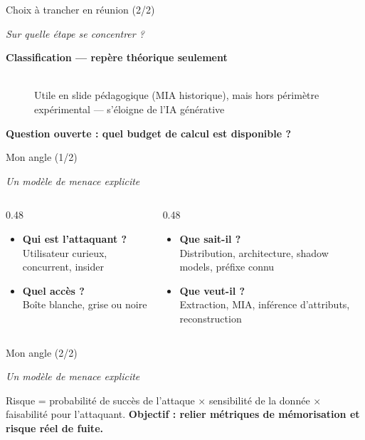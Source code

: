 \documentclass[aspectratio=169, 10pt, table]{beamer}
\newcommand{\subtitleline}[1]{{\small\itshape\color{TSPcyan}#1\par}\vspace{0.2cm}}
\begin{document}
\begin{frame}{Choix à trancher en réunion (2/2)}
    \subtitleline{Sur quelle étape se concentrer ?}
    
    \begin{description}
        \item[\textbf{Classification — repère théorique seulement}] \hfill \\
        Utile en slide pédagogique (MIA historique), mais hors périmètre expérimental — s'éloigne de l'IA générative
    \end{description}
    \vspace{0.4cm}
    \textbf{Question ouverte : quel budget de calcul est disponible ?}
\end{frame}

\begin{frame}{Mon angle (1/2)}
    \subtitleline{Un modèle de menace explicite}
    
    \begin{columns}[T]
        \begin{column}{0.48\textwidth}
            \begin{itemize}
                \item \textbf{Qui est l'attaquant ?} \\ Utilisateur curieux, concurrent, insider
                \item \textbf{Quel accès ?} \\ Boîte blanche, grise ou noire
            \end{itemize}
        \end{column}
        \begin{column}{0.48\textwidth}
            \begin{itemize}
                \item \textbf{Que sait-il ?} \\ Distribution, architecture, shadow models, préfixe connu
                \item \textbf{Que veut-il ?} \\ Extraction, MIA, inférence d'attributs, reconstruction
            \end{itemize}
        \end{column}
    \end{columns}
\end{frame}

\begin{frame}{Mon angle (2/2)}
    \subtitleline{Un modèle de menace explicite}
    
    \vspace{0.4cm}
    \begin{alertblock}{}
    Risque = probabilité de succès de l'attaque × sensibilité de la donnée × faisabilité pour l'attaquant. \textbf{Objectif : relier métriques de mémorisation et risque réel de fuite.}
    \end{alertblock}
\end{frame}
\end{document}
